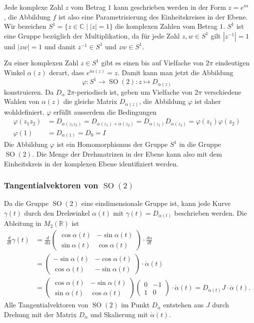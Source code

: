 Jede komplexe Zahl $z$ vom Betrag $1$ kann geschrieben werden in der Form
$z=e^{i\alpha}$, die Abbildung $f$ ist also eine Parametrisierung des
Einheitskreises in der Ebene.
Wir bezeichen $S^1=\{z\in\mathbb{C}\;|\; |z|=1\}$ die komplexen Zahlen vom
Betrag $1$.
$S^1$ ist eine Gruppe bezüglich der Multiplikation, da für jede Zahl
$z,w\in S^1$ gilt
$|z^{-1}|=1$ und $|zw|=1$ und damit $z^{-1}\in S^1$ und $zw\in S^1$.

Zu einer komplexen Zahl $z\in S^1$ gibt es einen bis auf Vielfache
von $2\pi$ eindeutigen Winkel $\alpha(z)$ derart, dass $e^{i\alpha(z)}=z$.
Damit kann man jetzt die Abbildung
\[
\varphi
\colon
S^1\to \operatorname{SO}(2)
:
z\mapsto  D_{\alpha(z)}
\]
konstruieren.
Da $D_{\alpha}$ $2\pi$-periodisch ist, geben um Vielfache
von $2\pi$ verschiedene Wahlen von $\alpha(z)$ die gleiche
Matrix $D_{\alpha(z)}$, die Abbildung $\varphi$ ist daher
wohldefiniert.
$\varphi$ erfüllt ausserdem die Bedingungen
\begin{align*}
\varphi(z_1z_2)
&=
D_{\alpha(z_1z_2)}
=
D_{\alpha(z_1)+\alpha(z_2)}
=
D_{\alpha(z_1)}D_{\alpha(z_2)}
=
\varphi(z_1)\varphi(z_2)
\\
\varphi(1)
&=
D_{\alpha(1)}
=
D_0
=
I
\end{align*}
Die Abbildung $\varphi$ ist ein Homomorphismus der Gruppe $S^1$
in die Gruppe $\operatorname{SO}(2)$.
Die Menge der Drehmatrizen in der Ebene kann also mit dem Einheitskreis
in der komplexen Ebene identifiziert werden.

\subsubsection{Tangentialvektoren von $\operatorname{SO}(2)$}
Da die Gruppe $\operatorname{SO}(2)$ eine eindimensionale Gruppe
ist, kann jede Kurve $\gamma(t)$ durch den Drehwinkel $\alpha(t)$
mit $\gamma(t) = D_{\alpha(t)}$ beschrieben werden.
Die Ableitung in $M_2(\mathbb{R})$ ist
\begin{align*}
\frac{d}{dt} \gamma(t)
&=
\frac{d}{d\alpha}
\begin{pmatrix}
\cos\alpha(t) & - \sin\alpha(t)\\
\sin\alpha(t) &   \cos\alpha(t)
\end{pmatrix}
\cdot
\frac{d\alpha}{dt}
\\
&=
\begin{pmatrix}
-\sin\alpha(t)&-\cos\alpha(t)\\
 \cos\alpha(t)&-\sin\alpha(t)
\end{pmatrix}
\cdot
\dot{\alpha}(t)
\\
&=
\begin{pmatrix}
\cos\alpha(t) & - \sin\alpha(t)\\
\sin\alpha(t) &   \cos\alpha(t)
\end{pmatrix}
\begin{pmatrix}
0&-1\\
1&0
\end{pmatrix}
\cdot
\dot{\alpha}(t)
=
D_{\alpha(t)}J\cdot\dot{\alpha}(t).
\end{align*}
Alle Tangentialvektoren von $\operatorname{SO}(2)$ im Punkt $D_\alpha$
entstehen aus $J$ durch Drehung mit der Matrix $D_\alpha$ und Skalierung
mit $\dot{\alpha}(t)$.

